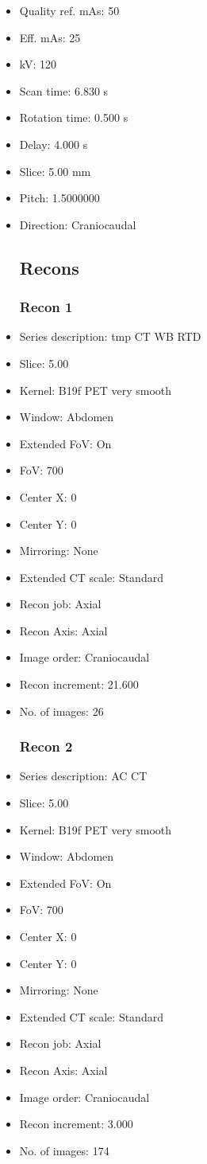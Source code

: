 \documentclass[12pt]{article}
\begin{document}
\begin{itemize}
\subsection{Scan}
\item Quality ref. mAs: 50\item Eff. mAs: 25\item kV: 120\item Scan time: 6.830 s\item Rotation time: 0.500 s\item Delay: 4.000 s\item Slice: 5.00 mm\item Pitch: 1.5000000\item Direction: Craniocaudal\subsection{Recons}

\subsubsection{Recon 1}
\item Series description: tmp CT WB RTD
\item Slice: 5.00
\item Kernel: B19f PET very smooth
\item Window: Abdomen
\item Extended FoV: On
\item FoV: 700
\item Center X: 0
\item Center Y: 0
\item Mirroring: None
\item Extended CT scale: Standard
\item Recon job: Axial
\item Recon Axis: Axial
\item Image order: Craniocaudal
\item Recon increment: 21.600
\item No. of images: 26
\subsubsection{Recon 2}
\item Series description: AC CT
\item Slice: 5.00
\item Kernel: B19f PET very smooth
\item Window: Abdomen
\item Extended FoV: On
\item FoV: 700
\item Center X: 0
\item Center Y: 0
\item Mirroring: None
\item Extended CT scale: Standard
\item Recon job: Axial
\item Recon Axis: Axial
\item Image order: Craniocaudal
\item Recon increment: 3.000
\item No. of images: 174

\end{itemize}
\end{document}
